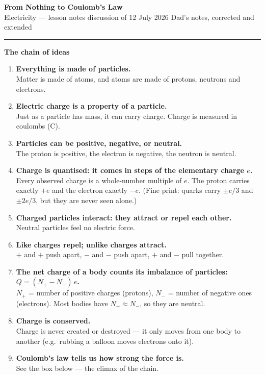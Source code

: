 \documentclass[11pt,a4paper]{article}
\newcommand{\nsec}[1]{\vspace{8pt}\par{\color{accent}\large\bfseries #1}\par\vspace{2pt}}
\begin{document}
\color{ink}

{\huge\bfseries From Nothing to Coulomb's Law}\\[4pt]
{\color{muted} Electricity --- lesson notes \;\textperiodcentered\; discussion of 12 July 2026 \;\textperiodcentered\; Dad's notes, corrected and extended}\\[6pt]
{\color{rule}\rule{\linewidth}{0.9pt}}

\nsec{The chain of ideas}
\begin{enumerate}[label=\textcolor{accent}{\textbf{\arabic*.}}, leftmargin=1.9em, itemsep=2.5pt, topsep=2pt]
  \item \textbf{Everything is made of particles.}\\
        {\small\color{muted} Matter is made of atoms, and atoms are made of protons, neutrons and electrons.}
  \item \textbf{Electric charge is a property of a particle.}\\
        {\small\color{muted} Just as a particle has mass, it can carry charge. Charge is measured in coulombs (C).}
  \item \textbf{Particles can be positive, negative, or neutral.}\\
        {\small\color{muted} The proton is positive, the electron is negative, the neutron is neutral.}
  \item \textbf{Charge is quantised: it comes in steps of the elementary charge $e$.}\\
        {\small\color{muted} Every observed charge is a whole-number multiple of $e$. The proton carries exactly $+e$
        and the electron exactly $-e$. (Fine print: quarks carry $\pm e/3$ and $\pm 2e/3$, but they are never seen alone.)}
  \item \textbf{Charged particles interact: they attract or repel each other.}\\
        {\small\color{muted} Neutral particles feel no electric force.}
  \item \textbf{Like charges repel; unlike charges attract.}\\
        {\small\color{muted} $+$ and $+$ push apart, $-$ and $-$ push apart, $+$ and $-$ pull together.}
  \item \textbf{The net charge of a body counts its imbalance of particles: $Q = (N_{+} - N_{-})\,e$.}\\
        {\small\color{muted} $N_{+}$ = number of positive charges (protons), $N_{-}$ = number of negative ones
        (electrons). Most bodies have $N_{+} \approx N_{-}$, so they are neutral.}
  \item \textbf{Charge is conserved.}\\
        {\small\color{muted} Charge is never created or destroyed --- it only moves from one body to another
        (e.g.\ rubbing a balloon moves electrons onto it).}
  \item \textbf{Coulomb's law tells us how strong the force is.}\\
        {\small\color{muted} See the box below --- the climax of the chain.}
\end{enumerate}
\end{document}
